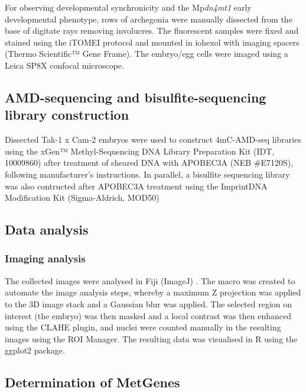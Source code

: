 For observing developmental synchronicity and the Mp\textit{dn4mt1} early developmental phenotype,  rows of archegonia were manually dissected from the base of digitate rays removing involucres. The fluorescent samples were fixed and stained using the iTOMEI protocol \citep{RN148} and mounted in iohexol with imaging spacers (Thermo Scientific™ Gene Frame). The embryo/egg cells were imaged using a Leica SP8X confocal microscope.

\subsection{AMD-sequencing and bisulfite-sequencing library construction}

Dissected Tak-1 x Cam-2 embryos were used to construct 4mC-AMD-seq libraries using the xGen™ Methyl-Sequencing DNA Library Preparation Kit (IDT, 10009860) after treatment of sheared DNA with APOBEC3A (NEB \#E7120S), following manufacturer’s instructions. In parallel, a bisulfite sequencing library was also contructed after APOBEC3A treatment using the Imprint\textregistered DNA Modification Kit (Sigma-Aldrich, MOD50)


\subsection{Data analysis}

\subsubsection{Imaging analysis}

The collected images were analysed in Fiji (ImageJ) \citep{RN266}. The macro was created to automate the image analysis steps, whereby a maximum Z projection was applied to the 3D image stack and a Gaussian blur was applied. The selected region on interest (the embryo) was then masked and a local contrast was then enhanced using the CLAHE plugin, and nuclei were counted manually in the resulting images using the ROI Manager. The resulting data was visualised in R using the ggplot2 package.

\subsection{Determination of MetGenes}

